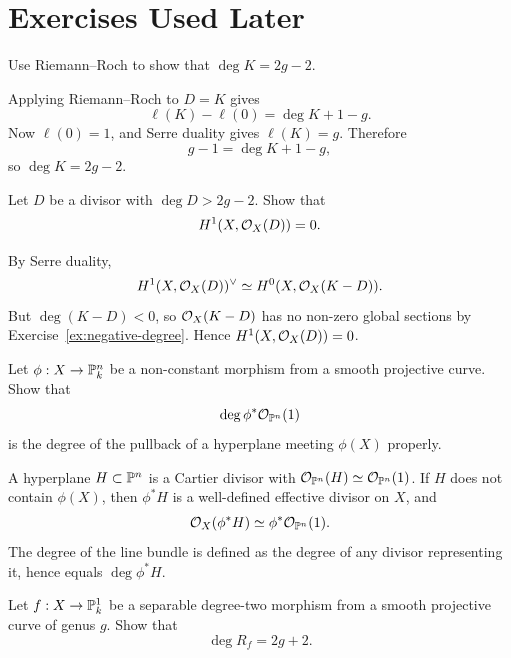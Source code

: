 \section{Exercises Used Later}

\begin{exercise}\label{ex:canonical-degree}
Use Riemann--Roch to show that \(\deg K=2g-2\).
\end{exercise}

\begin{solution}
Applying Riemann--Roch to \(D=K\) gives
\[
    \ell(K)-\ell(0)=\deg K+1-g.
\]
Now \(\ell(0)=1\), and Serre duality gives \(\ell(K)=g\).  Therefore
\[
    g-1=\deg K+1-g,
\]
so \(\deg K=2g-2\).
\end{solution}

\begin{exercise}\label{ex:nonspecial-large}
Let \(D\) be a divisor with \(\deg D>2g-2\).  Show that
\[
    H^1(X,\mathcal{O}_X(D))=0.
\]
\end{exercise}

\begin{solution}
By Serre duality,
\[
    H^1(X,\mathcal{O}_X(D))^\vee\simeq H^0(X,\mathcal{O}_X(K-D)).
\]
But \(\deg(K-D)<0\), so \(\mathcal{O}_X(K-D)\) has no non-zero global sections by
Exercise~\ref{ex:negative-degree}.  Hence \(H^1(X,\mathcal{O}_X(D))=0\).
\end{solution}

\begin{exercise}\label{ex:map-degree-line-bundle}
Let \(\phi:X\to\mathbb{P}^n_k\) be a non-constant morphism from a smooth projective
curve.  Show that
\[
    \deg\phi^*\mathcal{O}_{\mathbb{P}^n}(1)
\]
is the degree of the pullback of a hyperplane meeting \(\phi(X)\) properly.
\end{exercise}

\begin{solution}
A hyperplane \(H\subset\mathbb{P}^n\) is a Cartier divisor with
\(\mathcal{O}_{\mathbb{P}^n}(H)\simeq\mathcal{O}_{\mathbb{P}^n}(1)\).  If \(H\) does not contain
\(\phi(X)\), then \(\phi^*H\) is a well-defined effective divisor on \(X\), and
\[
    \mathcal{O}_X(\phi^*H)\simeq\phi^*\mathcal{O}_{\mathbb{P}^n}(1).
\]
The degree of the line bundle is defined as the degree of any divisor
representing it, hence equals \(\deg\phi^*H\).
\end{solution}

\begin{exercise}\label{ex:hurwitz-hyperelliptic}
Let \(f:X\to\mathbb{P}^1_k\) be a separable degree-two morphism from a smooth
projective curve of genus \(g\).  Show that
\[
    \deg R_f=2g+2.
\]
\end{exercise}

